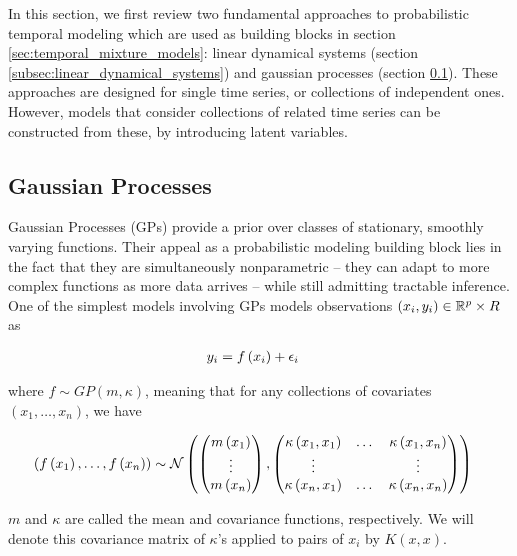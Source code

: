\documentclass{article}
\begin{document}
In this section, we first review two fundamental approaches to probabilistic
temporal modeling which are used as building blocks in section
\ref{sec:temporal_mixture_models}: linear dynamical systems (section
\ref{subsec:linear_dynamical_systems}) and gaussian processes (section
\ref{subsec:gaussian_processes}). These approaches are designed for single time
series, or collections of independent ones. However, models that consider
collections of related time series can be constructed from these, by introducing
latent variables.

\subsection{Gaussian Processes}
\label{subsec:gaussian_processes}

Gaussian Processes (GPs) provide a prior over classes of stationary, smoothly
varying functions. Their appeal as a probabilistic modeling building block lies
in the fact that they are simultaneously nonparametric -- they can adapt to more
complex functions as more data arrives -- while still admitting tractable
inference. One of the simplest models involving GPs models observations
$\left(x_{i}, y_{i}\right) \in \mathbb{R}^{p}\times R$ as

\begin{align*}
y_{i} &= f\left(x_{i}\right) + \epsilon_{i}
\end{align*}

where $f \sim GP\left(m, \kappa\right)$, meaning that for any collections of
covariates $\left(x_{1}, \dots, x_{n}\right)$, we have

\begin{align*}
  \left(f\left(x_{1}\right), \dots, f\left(x_{n}\right)\right) &\sim
  \mathcal{N}\left( \begin{pmatrix} m\left(x_{1}\right) \\ \vdots \\ m\left(x_{n}\right) \end{pmatrix}, \begin{pmatrix} \kappa\left(x_{1}, x_{1}\right) & \dots & \kappa\left(x_{1}, x_{n}\right) \\ \vdots & & \vdots \\ \kappa\left(x_{n}, x_{1}\right) & \dots &\kappa\left(x_{n}, x_{n}\right) \end{pmatrix}\right)
\end{align*}

$m$ and $\kappa$ are called the mean and covariance functions, respectively. We
will denote this covariance matrix of $\kappa$'s applied to pairs of $x_{i}$ by
$K\left(x, x\right)$.
\end{document}
